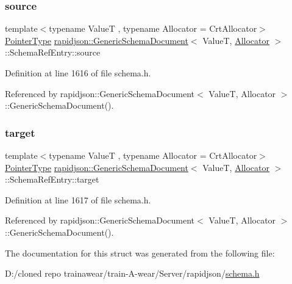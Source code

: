 \subsubsection{\texorpdfstring{source}{source}}
{\footnotesize\ttfamily template$<$typename ValueT , typename Allocator  = Crt\+Allocator$>$ \\
\mbox{\hyperlink{classrapidjson_1_1_generic_schema_document_a61540c0f8aa542760ae03257a0e6dab7}{Pointer\+Type}} \mbox{\hyperlink{classrapidjson_1_1_generic_schema_document}{rapidjson\+::\+Generic\+Schema\+Document}}$<$ ValueT, \mbox{\hyperlink{classrapidjson_1_1_allocator}{Allocator}} $>$\+::Schema\+Ref\+Entry\+::source}



Definition at line 1616 of file schema.\+h.



Referenced by rapidjson\+::\+Generic\+Schema\+Document$<$ Value\+T, Allocator $>$\+::\+Generic\+Schema\+Document().

\mbox{\label{structrapidjson_1_1_generic_schema_document_1_1_schema_ref_entry_a00f62e3429eb937487a4d8c499cbe11e}} 
\subsubsection{\texorpdfstring{target}{target}}
{\footnotesize\ttfamily template$<$typename ValueT , typename Allocator  = Crt\+Allocator$>$ \\
\mbox{\hyperlink{classrapidjson_1_1_generic_schema_document_a61540c0f8aa542760ae03257a0e6dab7}{Pointer\+Type}} \mbox{\hyperlink{classrapidjson_1_1_generic_schema_document}{rapidjson\+::\+Generic\+Schema\+Document}}$<$ ValueT, \mbox{\hyperlink{classrapidjson_1_1_allocator}{Allocator}} $>$\+::Schema\+Ref\+Entry\+::target}



Definition at line 1617 of file schema.\+h.



Referenced by rapidjson\+::\+Generic\+Schema\+Document$<$ Value\+T, Allocator $>$\+::\+Generic\+Schema\+Document().



The documentation for this struct was generated from the following file\+:\begin{DoxyCompactItemize}
\item 
D\+:/cloned repo trainawear/train-\/\+A-\/wear/\+Server/rapidjson/\mbox{\hyperlink{schema_8h}{schema.\+h}}\end{DoxyCompactItemize}
